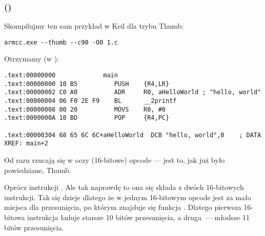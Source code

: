 \subsubsection{\NonOptimizingKeilVI (\ThumbMode)}

Skompilujmy ten sam przykład w Keil dla trybu Thumb:

\begin{lstlisting}
armcc.exe --thumb --c90 -O0 1.c 
\end{lstlisting}

Otrzymamy (w \IDA):

\begin{lstlisting}[caption=\NonOptimizingKeilVI (\ThumbMode) + \IDA,style=customasmARM]
.text:00000000             main
.text:00000000 10 B5          PUSH    {R4,LR}
.text:00000002 C0 A0          ADR     R0, aHelloWorld ; "hello, world"
.text:00000004 06 F0 2E F9    BL      __2printf
.text:00000008 00 20          MOVS    R0, #0
.text:0000000A 10 BD          POP     {R4,PC}

.text:00000304 68 65 6C 6C+aHelloWorld  DCB "hello, world",0    ; DATA XREF: main+2
\end{lstlisting}

Od razu rzucają się w oczy (16-bitowe) opcode --- jest to, jak już było powiedziane, Thumb.

Oprócz instrukcji .
Ale tak naprawdę to ona się składa z dwóch 16-bitowych instrukcji.
Tak się dzieje dlatego że w jednym 16-bitowym opcode jest za mało miejsca dla przesunięcia, po którym znajduje się funkcja \printf.
Dlatego pierwsza 16-bitowa instrukcja ładuje starsze 10 bitów przesunięcia, a druga~--- młodsze 11 bitów przesunięcia.


